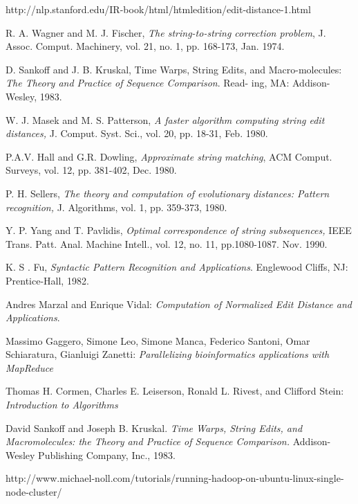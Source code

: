 \documentclass[conference]{IEEEtran}
\begin{document}
\begin{thebibliography}{1}

http://nlp.stanford.edu/IR-book/html/htmledition/edit-distance-1.html

R. A. Wagner and M. J. Fischer, \textit{The string-to-string correction problem}, J. Assoc. Comput. Machinery, vol. 21, no. 1, pp. 168-173,
Jan. 1974.

D. Sankoff and J. B. Kruskal, Time Warps, String Edits, and Macro-molecules: \textit{The Theory and Practice of Sequence Comparison}. Read-
ing, MA: Addison-Wesley, 1983.

W. J. Masek and M. S. Patterson, \textit{A faster algorithm computing string edit distances,} J. Comput. Syst. Sci., vol. 20, pp. 18-31, Feb. 1980.

P.A.V. Hall and G.R. Dowling, \textit{Approximate string matching}, ACM Comput. Surveys, vol. 12, pp. 381-402, Dec. 1980.

P. H. Sellers, \textit{The theory and computation of evolutionary distances: Pattern recognition,} J. Algorithms, vol. 1, pp. 359-373, 1980.

Y. P. Yang and T. Pavlidis, \textit{Optimal correspondence of string subsequences,} IEEE Trans. Patt. Anal. Machine Intell., vol. 12, no. 11, pp.1080-1087. Nov. 1990.

K. S . Fu, \textit{Syntactic Pattern Recognition and Applications}. Englewood Cliffs, NJ: Prentice-Hall, 1982.

Andres Marzal and Enrique Vidal: \textit{Computation of Normalized Edit Distance and Applications}.

Massimo Gaggero, Simone Leo, Simone Manca, Federico Santoni, Omar Schiaratura, Gianluigi Zanetti: \textit{Parallelizing bioinformatics applications with MapReduce}

Thomas H. Cormen, Charles E. Leiserson, Ronald L. Rivest, and Clifford Stein: \textit{Introduction to Algorithms}

David Sankoff and Joseph B. Kruskal. \textit{Time Warps, String Edits, and Macromolecules: the Theory and Practice of Sequence Comparison.} Addison-Wesley Publishing Company, Inc., 1983. 


\bibitem{}
http://www.michael-noll.com/tutorials/running-hadoop-on-ubuntu-linux-single-node-cluster/


\end{thebibliography}
\end{document}
